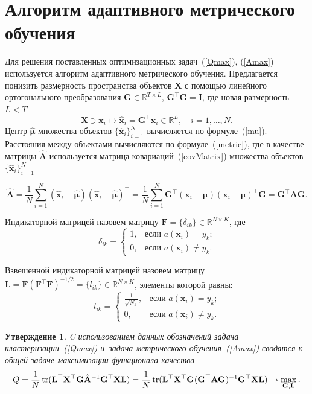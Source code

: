 \documentclass[12pt,twoside]{article}
\newcommand{\x}{\mathbf{x}}
\newtheorem{Th}{Утверждение}
\begin{document}
\section{Алгоритм адаптивного метрического обучения}
Для решения поставленных оптимизационных задач~(\ref{Qmax}), (\ref{Amax}) используется алгоритм адаптивного метрического обучения.
Предлагается понизить размерность пространства объектов $\mathbf{X}$ с помощью линейного ортогонального преобразования $\mathbf{G} \in \mathbb{R}^{T \times L}$, $\mathbf{G}^{\top} \mathbf{G} = \mathbf{I}$, где новая размерность $L < T$
\[
    \mathbf{X} \ni \x_i  \mapsto \hat{\x}_i = \mathbf{G}^\top \x_i \in \mathbb{R}^L, \quad i = 1, \ldots, N.
\]
Центр $\hat{\boldsymbol{\mu}}$ множества объектов $\{\hat{\x}_i\}_{i=1}^N$ вычисляется по формуле~(\ref{mu}). Расстояния между объектами вычисляются по формуле~(\ref{metric}), где в качестве матрицы $\hat{\mathbf{A}}$ используется матрица ковариаций~(\ref{covMatrix}) множества объектов $\{\hat{\x}_i\}_{i=1}^N$

\[
    \hat{\mathbf{A}} =
    \frac 1N \sum_{i=1}^N (\hat{\x}_i - \hat{\boldsymbol{\mu}})(\hat{\x}_i - \hat{\boldsymbol{\mu}})^\top =
    \frac 1N \sum_{i=1}^N \mathbf{G}^{\top}(\x_i - \boldsymbol{\mu})(\x_i - \boldsymbol{\mu})^\top \mathbf{G} =  \mathbf{G}^{\top} \mathbf{A} \mathbf{G}.
\]
\begin{Def}
Индикаторной матрицей назовем матрицу $\mathbf{F} = \{\delta_{ik}\} \in \mathbb{R}^{N \times K}$, где
\[
\delta_{ik} =
\begin{cases}
1, & \text{если $a(\x_i) = y_k$;} \\
0, & \text{если $a(\x_i) \neq y_k$.}
\end{cases}
\]
\end{Def}
\begin{Def}
Взвешенной индикаторной матрицей назовем матрицу
$\mathbf{L} = \mathbf{F} (\mathbf{F}^{\top} \mathbf{F})^{-1/2} = \{l_{ik}\} \in \mathbb{R}^{N \times K}$, элементы которой равны:
\[
     l_{ik} =
     \begin{cases}
    \displaystyle    \frac 1{\sqrt{N_k}}, & \text{если $a(\x_i) = y_k$;} \\
        0, & \text{если $a(\x_i) \neq y_k$.}
     \end{cases}
\]
\end{Def}
\begin{Th}
C использованием данных обозначений задача кластеризации~(\ref{Qmax})
и~задача метрического обучения~(\ref{Amax}) сводятся к общей задаче максимизации функционала качества~\cite{ding2005equivalence}
\begin{equation}
\label{GLmax}
    Q = \frac 1N \Tr (\mathbf{L}^{\top} \mathbf{X}^{\top} \mathbf{G} \hat{\mathbf{A}}^{-1} \mathbf{G}^{\top} \mathbf{X L}) = \frac 1N \Tr (\mathbf{L}^{\top} \mathbf{X}^{\top} \mathbf{G}
    (\mathbf{G}^{\top} \mathbf{A G})^{-1} \mathbf{G}^{\top} \mathbf{X L}) \to \max_{\mathbf{G}, \mathbf{L}}.
\end{equation}
\end{Th}
\end{document}

